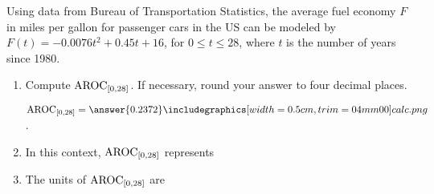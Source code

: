 \documentclass{ximera}
\author{Kenneth Berglund}
\begin{document}
\licenseSZ
\begin{exercise}

Using data from Bureau of Transportation Statistics, the average fuel economy $F$ in miles per gallon for passenger cars in the US can be modeled by $F(t) = -0.0076t^2 + 0.45t + 16$, for $0 \le t \le 28$, where $t$ is the number of years since 1980.

\begin{enumerate}
\item Compute $\mathrm{AROC}_{[0, 28]}$.  If necessary, round your answer to four decimal places.

$\av_{[0, 28]} = \answer{0.2372} \calcHW$.

\item In this context, $\mathrm{AROC}_{[0, 28]}$ represents
\begin{multipleChoice}
\end{multipleChoice}

\item The units of $\mathrm{AROC}_{[0, 28]}$ are
\begin{multipleChoice}
\end{multipleChoice}
\end{enumerate}



\end{exercise}
\end{document}
